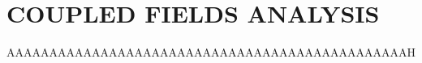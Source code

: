 \section{COUPLED FIELDS ANALYSIS} \label{ch_5.4}
\normalsize{AAAAAAAAAAAAAAAAAAAAAAAAAAAAAAAAAAAAAAAAAAAAAAAH}